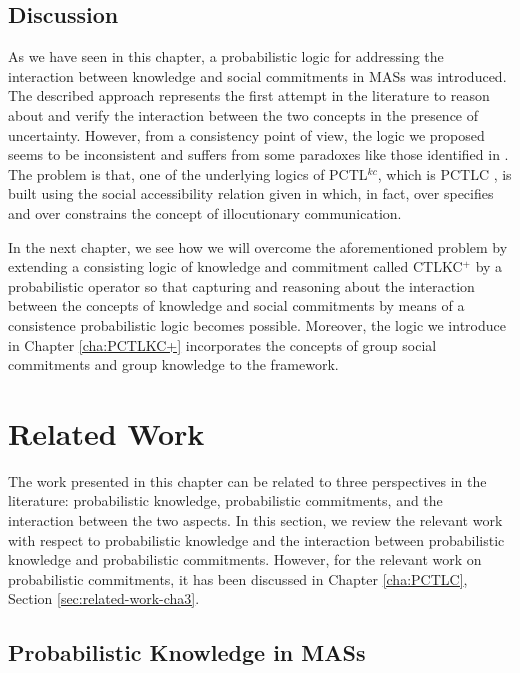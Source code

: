 
\subsection{Discussion} \label{sec:discussion-cha4}

As we have seen in this chapter, a probabilistic logic for addressing the interaction between knowledge and social commitments in MASs was introduced. The described approach represents the first attempt in the literature to reason about and verify the interaction between the two concepts in the presence of uncertainty. However, from a consistency point of view, the logic we proposed seems to be inconsistent and suffers from some paradoxes like those identified in \cite{Al-Saqqar2014a}. The problem is that, one of the underlying logics of PCTL$^{kc}$, which is PCTLC \cite{Sultan2013}, is built using the social accessibility relation given in \cite{Bentahar2012,El-Menshawy2013a} which, in fact, over specifies and over constrains the concept of illocutionary communication.

In the next chapter, we see how we will overcome the aforementioned problem by extending a consisting logic of knowledge and commitment called CTLKC$^+$ \cite{Al-Saqqar2014a} by a probabilistic operator so that capturing and reasoning about the interaction between the concepts of knowledge and social commitments by means of a consistence probabilistic logic becomes possible. Moreover, the logic we introduce in Chapter \ref{cha:PCTLKC+} incorporates the concepts of group social commitments and group knowledge to the framework.



\section{Related Work} \label{sec:related-work-cha4}

The work presented in this chapter can be related to three perspectives
in the literature: probabilistic knowledge, probabilistic commitments,
and the interaction between the two aspects. In this section,
we review the relevant work with respect to probabilistic knowledge
and the interaction between probabilistic knowledge and probabilistic
commitments. However, for the relevant work on probabilistic
commitments, it has been discussed in Chapter \ref{cha:PCTLC}, Section \ref{sec:related-work-cha3}.

\subsection{Probabilistic Knowledge in MASs }

